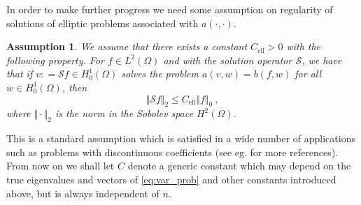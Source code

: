\documentclass[preprint ,12pt]{elsarticle}
\newtheorem{assumption}[theorem]{Assumption}
\newcommand{\cS}{\mathcal{S}}
\begin{document}
In order to make further progress we need some assumption on
regularity of solutions of elliptic problems associated with $a(\cdot,
\cdot)$.
\begin{assumption}\label{ass:ell}
 We assume that there exists a constant
$C_\mathrm{ell}>0$ with the following property.
For   $f \in L^2(\Omega)$ and with the solution operator $\cS$, we have that if  $v: = \cS f\in H^1_0(\Omega)$ solves  the
problem {$a(v,w) = b(f,w) $} for all $w \in
H^1_0(\Omega)$, then 
\begin{equation}\label{eq:ass_reg_pcf}
\Vert \cS f \Vert_{{2}} \leq
C_\mathrm{ell}\Vert f \Vert_0\ ,
\end{equation}
where  $\Vert \cdot \Vert_{2}$ is the norm in   the Sobolev space $H^{2}(\Omega)$.
\end{assumption}
This is a standard assumption which is satisfied in a wide number of
applications such as problems with discontinuous coefficients
(see eg. \cite{conv_sinum} for more references).\\

From now on we shall let $C$ denote  a generic constant which 
may depend
on the 
true eigenvalues and vectors of \eqref{eq:var_prob} and other
constants introduced above, but is always independent of
$n$. 
\end{document}
